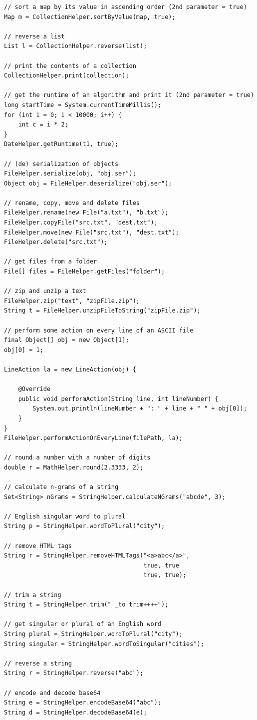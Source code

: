 \documentclass[a4paper,twoside]{article}      %
\begin{document}
\begin{codelisting}
\begin{lstlisting}[frame=tb]
// sort a map by its value in ascending order (2nd parameter = true)
Map m = CollectionHelper.sortByValue(map, true);

// reverse a list
List l = CollectionHelper.reverse(list);

// print the contents of a collection
CollectionHelper.print(collection);

// get the runtime of an algorithm and print it (2nd parameter = true)
long startTime = System.currentTimeMillis();
for (int i = 0; i < 10000; i++) {
	int c = i * 2;
}
DateHelper.getRuntime(t1, true);

// (de) serialization of objects
FileHelper.serialize(obj, "obj.ser");
Object obj = FileHelper.deserialize("obj.ser");

// rename, copy, move and delete files
FileHelper.rename(new File("a.txt"), "b.txt");
FileHelper.copyFile("src.txt", "dest.txt");
FileHelper.move(new File("src.txt"), "dest.txt");
FileHelper.delete("src.txt");

// get files from a folder
File[] files = FileHelper.getFiles("folder");

// zip and unzip a text
FileHelper.zip("text", "zipFile.zip");
String t = FileHelper.unzipFileToString("zipFile.zip");

// perform some action on every line of an ASCII file
final Object[] obj = new Object[1];
obj[0] = 1;

LineAction la = new LineAction(obj) {
  
    @Override
    public void performAction(String line, int lineNumber) {
        System.out.println(lineNumber + ": " + line + " " + obj[0]); 
    }
}
FileHelper.performActionOnEveryLine(filePath, la);

// round a number with a number of digits
double r = MathHelper.round(2.3333, 2);

// calculate n-grams of a string
Set<String> nGrams = StringHelper.calculateNGrams("abcde", 3);

// English singular word to plural
String p = StringHelper.wordToPlural("city");

// remove HTML tags
String r = StringHelper.removeHTMLTags("<a>abc</a>",
                                       true, true
                                       true, true);

// trim a string
String t = StringHelper.trim(" _to trim++++");

// get singular or plural of an English word
String plural = StringHelper.wordToPlural("city");
String singular = StringHelper.wordToSingular("cities");

// reverse a string
String r = StringHelper.reverse("abc");

// encode and decode base64
String e = StringHelper.encodeBase64("abc");
String d = StringHelper.decodeBase64(e);

\end{lstlisting}
\end{codelisting}
\end{document}
